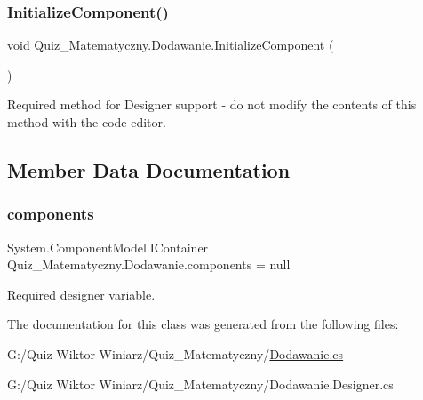 \subsubsection{\texorpdfstring{InitializeComponent()}{InitializeComponent()}}
{\footnotesize\ttfamily void Quiz\+\_\+\+Matematyczny.\+Dodawanie.\+Initialize\+Component (\begin{DoxyParamCaption}{ }\end{DoxyParamCaption})\hspace{0.3cm}{\ttfamily [private]}}



Required method for Designer support -\/ do not modify the contents of this method with the code editor. 



\subsection{Member Data Documentation}
\mbox{\label{class_quiz___matematyczny_1_1_dodawanie_a1c9357c43c148c2c573b918b8d8211a6}} 
\subsubsection{\texorpdfstring{components}{components}}
{\footnotesize\ttfamily System.\+Component\+Model.\+I\+Container Quiz\+\_\+\+Matematyczny.\+Dodawanie.\+components = null\hspace{0.3cm}{\ttfamily [private]}}



Required designer variable. 



The documentation for this class was generated from the following files\+:\begin{DoxyCompactItemize}
\item 
G\+:/\+Quiz Wiktor Winiarz/\+Quiz\+\_\+\+Matematyczny/\mbox{\hyperlink{_dodawanie_8cs}{Dodawanie.\+cs}}\item 
G\+:/\+Quiz Wiktor Winiarz/\+Quiz\+\_\+\+Matematyczny/Dodawanie.\+Designer.\+cs\end{DoxyCompactItemize}
